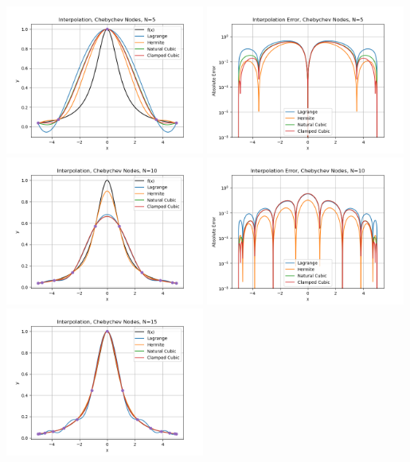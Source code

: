 \documentclass[10pt]{article}
\begin{document}
\begin{enumerate}
    \includegraphics[width=0.49\textwidth]{cheb_N5_interp.png}
    \includegraphics[width=0.49\textwidth]{cheb_N5_error.png}
    \includegraphics[width=0.49\textwidth]{cheb_N10_interp.png}
    \includegraphics[width=0.49\textwidth]{cheb_N10_error.png}
    \includegraphics[width=0.49\textwidth]{cheb_N15_interp.png}

\end{enumerate}
\end{document}
